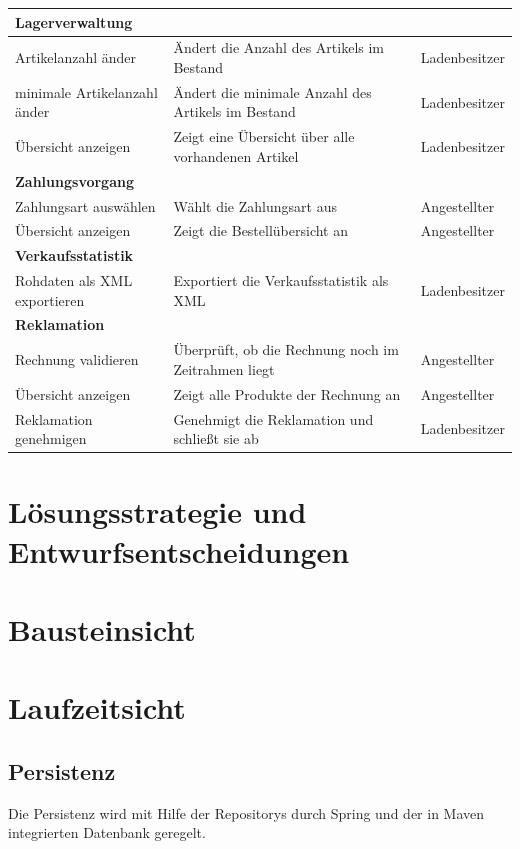 \documentclass[pdftex,12pt,a4paper]{article}
\begin{document}
\newpage
\begin{tabular}{|p{\third}|p{\third}|p{\third}|} \hline
\multicolumn{3}{|l|}{\textbf{Lagerverwaltung}}\\ \hline
Artikelanzahl \"ander & \"Andert die Anzahl des Artikels im Bestand & Ladenbesitzer\\ \hline
minimale Artikelanzahl \"ander & \"Andert die  minimale Anzahl des Artikels im Bestand & Ladenbesitzer \\ \hline
\"Ubersicht anzeigen & Zeigt eine \"Ubersicht \"uber alle vorhandenen Artikel & Ladenbesitzer\\ \hline
\multicolumn{3}{|l|}{\textbf{Zahlungsvorgang}}\\ \hline
Zahlungsart ausw\"ahlen & W\"ahlt die Zahlungsart aus & Angestellter\\ \hline
\"Ubersicht anzeigen & Zeigt die Bestell\"ubersicht an & Angestellter\\ \hline
\multicolumn{3}{|l|}{\textbf{Verkaufsstatistik}}\\ \hline
Rohdaten als XML exportieren & Exportiert die Verkaufsstatistik als XML & Ladenbesitzer\\ \hline
\multicolumn{3}{|l|}{\textbf{Reklamation}}\\ \hline
Rechnung validieren & \"Uberpr\"uft, ob die Rechnung noch im Zeitrahmen liegt & Angestellter\\ \hline
\"Ubersicht anzeigen & Zeigt alle Produkte der Rechnung an & Angestellter\\ \hline
Reklamation genehmigen & Genehmigt die Reklamation und schlie\ss{}t sie ab & Ladenbesitzer\\ \hline
\end{tabular}

\newpage
\section{Lösungsstrategie und Entwurfsentscheidungen}

\section{Bausteinsicht}

\section{Laufzeitsicht}

\subsection{Persistenz}
Die Persistenz wird mit Hilfe der Repositorys durch Spring und der in Maven integrierten Datenbank geregelt.
\end{document}
